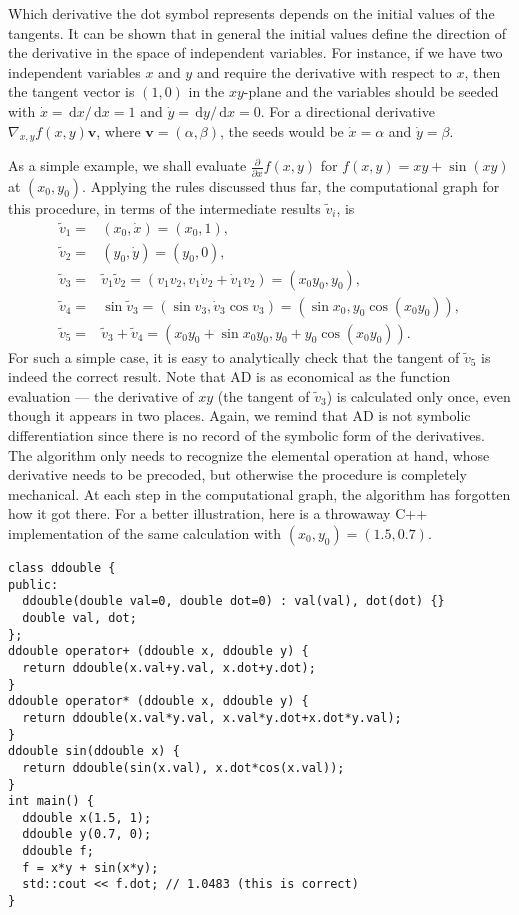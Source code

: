 \documentclass{article}
\newcommand{\D}{\,\textrm{d}}
\begin{document}
Which derivative the dot symbol represents depends on the initial values of the tangents. It can be shown that in general the initial values define the direction of the derivative in the space of independent variables. For instance, if we have two independent variables $x$ and $y$ and require the derivative with respect to $x$, then the tangent vector is $(1,0)$ in the $xy$-plane and the variables should be seeded with $\dot x = \D x/\D x = 1$ and $\dot y = \D y/\D x = 0$. For a directional derivative $\nabla_{x,y}f(x,y) \bm v$, where $\bm v = (\alpha, \beta)$, the seeds would be $\dot x = \alpha$ and $\dot y = \beta$.

As a simple example, we shall evaluate $\frac{\partial}{\partial x} f(x, y)$ for $f(x, y) = x y + \sin (xy)$ at $(x_0,y_0)$. Applying the rules discussed thus far, the computational graph for this procedure, in terms of the intermediate results $\tilde v_i$, is
\begin{equation}
  \label{eq:forward_example}
  \begin{split}
    \tilde v_1 =& (x_0,\dot x) = (x_0,1), \\
    \tilde v_2 =& (y_0,\dot y) = (y_0,0), \\
    \tilde v_3 =& \tilde v_1\tilde v_2 = (v_1v_2, v_1 \dot v_2 +
    \dot v_1 v_2) = (x_0y_0, y_0), \\
    \tilde v_4 =& \sin \tilde v_3 = (\sin v_3, \dot v_3 \cos v_3) =
    (\sin x_0, y_0 \cos (x_0y_0)), \\
    \tilde v_5 =& \tilde v_3 + \tilde v_4 = (x_0y_0 + \sin x_0y_0, y_0
    + y_0 \cos (x_0y_0)).
  \end{split}
\end{equation}
For such a simple case, it is easy to analytically check that the tangent of $\tilde v_5$ is indeed the correct result. Note that AD is as economical as the function evaluation --- the derivative of $xy$ (the tangent of $\tilde v_3$) is calculated only once, even though it appears in two places. Again, we remind that AD is not symbolic differentiation since there is no record of the symbolic form of the derivatives. The algorithm only needs to recognize the elemental operation at hand, whose derivative needs to be precoded, but otherwise the procedure is completely mechanical. At each step in the computational graph, the algorithm has forgotten how it got there. For a better illustration, here is a throwaway C++ implementation of the same calculation with $(x_0,y_0) = (1.5,0.7)$.
\begin{verbatim}
class ddouble {
public:
  ddouble(double val=0, double dot=0) : val(val), dot(dot) {}
  double val, dot;
};
ddouble operator+ (ddouble x, ddouble y) {
  return ddouble(x.val+y.val, x.dot+y.dot);
}
ddouble operator* (ddouble x, ddouble y) {
  return ddouble(x.val*y.val, x.val*y.dot+x.dot*y.val);
}
ddouble sin(ddouble x) {
  return ddouble(sin(x.val), x.dot*cos(x.val));
}
int main() {
  ddouble x(1.5, 1);
  ddouble y(0.7, 0);
  ddouble f;
  f = x*y + sin(x*y);
  std::cout << f.dot; // 1.0483 (this is correct)
}
\end{verbatim}
\end{document}
